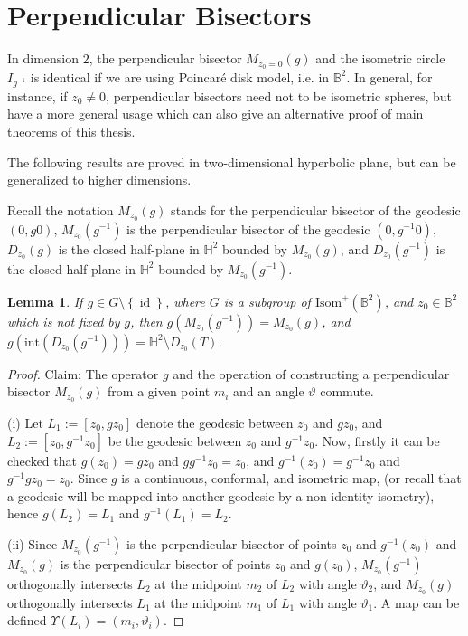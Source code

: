 \documentclass[12pt,oneside]{sfsuthesis}
\theoremstyle{plain} %
\newtheorem{lemma}[theorem]{Lemma}
\theoremstyle{definition}  %
\theoremstyle{remark}  %
\theoremstyle{plain}
\DeclareMathOperator{\id}{id}
\begin{document}
{\section{Perpendicular Bisectors}

In dimension $2$, the perpendicular bisector $M_{z_0=0}(g)$ and the isometric circle $I_{g^{-1}}$ is identical if we are using Poincar\'{e} disk model, i.e. in $\mathbb{B}^2$. In general, for instance, if $z_0\neq 0$, perpendicular bisectors need not to be isometric spheres, but have a more general usage which can also give an alternative proof of main theorems of this thesis.

The following results are proved in two-dimensional hyperbolic plane, but can be generalized to higher dimensions.


Recall the notation $M_{z_0}(g)$ stands for the perpendicular bisector of the geodesic $(0,g0)$, $M_{z_0}(g^{-1})$ is the perpendicular bisector of the geodesic $(0,g^{-1}0)$, $D_{z_0}(g)$ is the closed half-plane in $\mathbb{H}^2$ bounded by $M_{z_0}(g)$, and $D_{z_0}(g^{-1})$ is the closed half-plane in $\mathbb{H}^2$ bounded by $M_{z_0}(g^{-1})$.

\begin{lemma}\label{bounded closed half-plane}\label{matryoshka}
If $g\in G\setminus \left\lbrace \id\right\rbrace$, where $G$ is a subgroup of $\text{Isom}^+(\mathbb{B}^2)$, and $z_0\in\mathbb{B}^2$ which is not fixed by $g$, then $g(M_{z_0}(g^{-1}))=M_{z_0}(g)$, and $g(\text{int}(D_{z_0}(g^{-1})))=\mathbb{H}^2\setminus D_{z_0}(T)$. 
\end{lemma}

\begin{proof}
Claim: The operator $g$ and the operation of constructing a perpendicular bisector $M_{z_0}(g)$ from a given point $m_i$ and an angle $\vartheta$ commute.

(i) Let $L_1:=[z_0,gz_0]$ denote the geodesic between $z_0$ and $gz_0$, and $L_2:=[z_0,g^{-1}z_0]$ be the geodesic between $z_0$ and $g^{-1}z_0$. Now, firstly it can be checked that $g(z_0)=gz_0$ and $gg^{-1}z_0=z_0$, and $g^{-1}(z_0)=g^{-1}z_0$ and $g^{-1}gz_0=z_0.$ Since $g$ is a continuous, conformal, and isometric map, (or recall that a geodesic will be mapped into another geodesic by a non-identity isometry), hence $g(L_2)=L_1$ and $g^{-1}(L_1)=L_2$.

(ii) Since $M_{z_0}(g^{-1})$ is the perpendicular bisector of points $z_0$ and $g^{-1}(z_0)$  and $M_{z_0}(g)$ is the perpendicular bisector of points $z_0$ and $g(z_0)$, $M_{z_0}(g^{-1})$ orthogonally intersects $L_2$ at the midpoint $m_2$ of $L_2$ with angle $\vartheta_2$, and $M_{z_0}(g)$ orthogonally intersects $L_1$ at the midpoint $m_1$ of $L_1$ with angle $\vartheta_1$. A map can be defined $\Upsilon(L_i)=(m_i,\vartheta_i)$.


\end{proof}}
\end{document}
